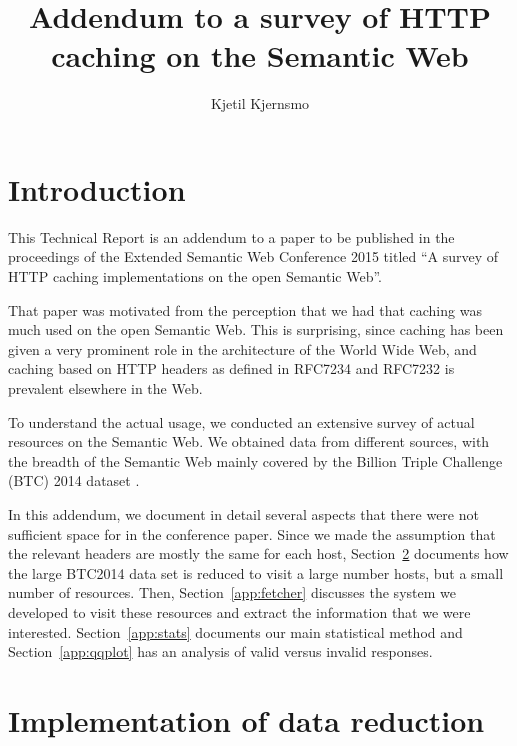 \documentclass{article}
\title{Addendum to a survey of HTTP caching on the Semantic Web}
\author{Kjetil Kjernsmo}
\begin{document}
\maketitle

\section{Introduction}

This Technical Report is an addendum to a paper to be published in the
proceedings of the Extended Semantic Web Conference 2015 titled ``A
survey of HTTP caching implementations on the open Semantic Web''.

That paper was motivated from the perception that we had that caching
was much used on the open Semantic Web. This is surprising, since
caching has been given a very prominent role in the architecture of
the World Wide Web, and caching based on HTTP headers as defined in
RFC7234 \cite{rfc7234} and RFC7232 \cite{rfc7232} is prevalent
elsewhere in the Web.

To understand the actual usage, we conducted an extensive survey of
actual resources on the Semantic Web. We obtained data from different
sources, with the breadth of the Semantic Web mainly covered by the
Billion Triple Challenge (BTC) 2014 dataset  \cite{btc-2014}.

In this addendum, we document in detail several aspects that there
were not sufficient space for in the conference paper. Since we made
the assumption that the relevant headers are mostly the same for each
host, Section~\ref{app:reduction} documents how the large BTC2014 data
set is reduced to visit a large number hosts, but a small number of
resources. Then, Section~\ref{app:fetcher} discusses the system we
developed to visit these resources and extract the information that we
were interested. Section~\ref{app:stats} documents our main
statistical method and Section~\ref{app:qqplot} has an analysis of
valid versus invalid responses.
 
\section{Implementation of data reduction}\label{app:reduction}
\end{document}
